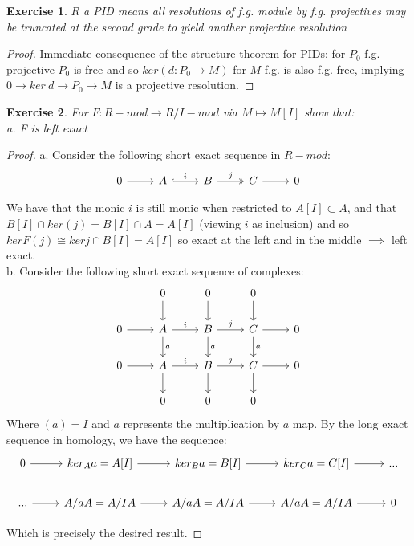\documentclass{article}
\newtheorem{exercise}{Exercise}
\begin{document}
\begin{exercise}
  $R$ a PID means all resolutions of f.g. module by f.g. projectives may be truncated at the second grade to yield another projective resolution 
\end{exercise}
\begin{proof}
  Immediate consequence of the structure theorem for PIDs: for ${P_{0}}$ f.g. projective $P_{0}$ is free and so $ker(d: P_{0} \to M)$ for $M$ f.g. is also f.g. free, implying $0 \to ker \ d \to P_{0} \to M$ is a projective resolution.
\end{proof}
\begin{exercise}
  For $F: R-mod \to R/I - mod$ via $M \mapsto M[I]$ show that: \\
  a. F is left exact
\end{exercise}
\begin{proof}
  a. Consider the following short exact sequence in $R-mod$:
  \[
    \begin{tikzcd}
0 \arrow[r] & A \arrow[r, "i", hook] & B \arrow[r, "j", two heads] & C \arrow[r] & 0
\end{tikzcd}
\]

We have that the monic $i$ is still monic when restricted to $A[I] \subset A$, and that $B[I] \cap ker(j) = B[I] \cap A = A[I]$ (viewing $i$ as inclusion) and so $ker F(j) \cong ker j \cap B[I] = A[I]$ so exact at the left and in the middle $\implies$ left exact. \\

b. Consider the following short exact sequence of complexes:
\[
  \begin{tikzcd}
            & 0 \arrow[d]                     & 0 \arrow[d]                     & 0 \arrow[d]                &   \\
0 \arrow[r] & A \arrow[r, "i"] \arrow[d, "a"] & B \arrow[r, "j"] \arrow[d, "a"] & C \arrow[r] \arrow[d, "a"] & 0 \\
0 \arrow[r] & A \arrow[r, "i"] \arrow[d]      & B \arrow[r, "j"] \arrow[d]      & C \arrow[r] \arrow[d]      & 0 \\
            & 0                               & 0                               & 0                          &  
\end{tikzcd}
\]
Where $(a) = I$ and $a$ represents the multiplication by $a$ map. By the long exact sequence in homology, we have the sequence:
\[
  \begin{tikzcd}
    0 \arrow[r] & {ker_A a = A[I]} \arrow[r] & {ker_B a = B[I]} \arrow[r] & {ker_C a = C[I]} \arrow[r] & ... \\
    ... \arrow[r] & A/aA = A/IA \arrow[r] & A/aA = A/IA \arrow[r] & A/aA = A/IA \arrow[r] & 0
\end{tikzcd}
\]

Which is precisely the desired result. 
\end{proof}
\end{document}
